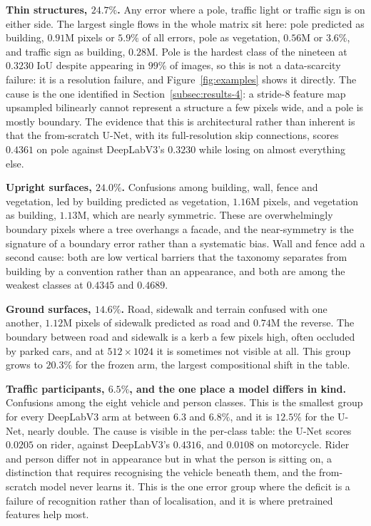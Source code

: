 \textbf{Thin structures, $24.7\%$.} Any error where a pole, traffic light or traffic sign is on
either side. The largest single flows in the whole matrix sit here: pole predicted as building,
$0.91$M pixels or $5.9\%$ of all errors, pole as vegetation, $0.56$M or $3.6\%$, and traffic sign
as building, $0.28$M. Pole is the hardest class of the nineteen at $0.3230$ IoU despite appearing in
$99\%$ of images, so this is not a data-scarcity failure: it is a resolution failure, and
Figure~\ref{fig:examples} shows it directly. The cause is the one identified in
Section~\ref{subsec:results-4}: a stride-8 feature map upsampled bilinearly cannot represent a
structure a few pixels wide, and a pole is mostly boundary. The evidence that this is
architectural rather than inherent is that the from-scratch U-Net, with its full-resolution skip
connections, scores $0.4361$ on pole against DeepLabV3's $0.3230$ while losing on almost
everything else.

\textbf{Upright surfaces, $24.0\%$.} Confusions among building, wall, fence and vegetation, led
by building predicted as vegetation, $1.16$M pixels, and vegetation as building, $1.13$M, which
are nearly symmetric. These are overwhelmingly boundary pixels where a tree overhangs a facade,
and the near-symmetry is the signature of a boundary error rather than a systematic bias. Wall
and fence add a second cause: both are low vertical barriers that the taxonomy separates from
building by a convention rather than an appearance, and both are among the weakest classes at
$0.4345$ and $0.4689$.

\textbf{Ground surfaces, $14.6\%$.} Road, sidewalk and terrain confused with one another,
$1.12$M pixels of sidewalk predicted as road and $0.74$M the reverse. The boundary between road
and sidewalk is a kerb a few pixels high, often occluded by parked cars, and at $512 \times 1024$
it is sometimes not visible at all. This group grows to $20.3\%$ for the frozen arm, the largest
compositional shift in the table.

\textbf{Traffic participants, $6.5\%$, and the one place a model differs in kind.} Confusions
among the eight vehicle and person classes. This is the smallest group for every DeepLabV3 arm at
between $6.3$ and $6.8\%$, and it is $12.5\%$ for the U-Net, nearly double. The cause is visible in the
per-class table: the U-Net scores $0.0205$ on rider, against DeepLabV3's $0.4316$, and $0.0108$
on motorcycle. Rider and person differ not in appearance but in what the person is sitting on, a
distinction that requires recognising the vehicle beneath them, and the from-scratch model never
learns it. This is the one error group where the deficit is a failure of recognition rather than
of localisation, and it is where pretrained features help most.

